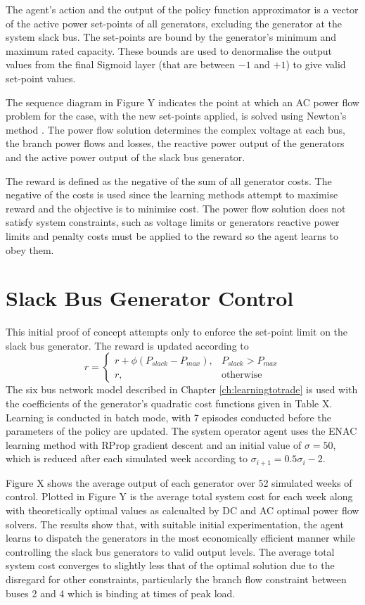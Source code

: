 The agent's action and the output of the policy function approximator is a
vector of the active power set-points of all generators, excluding the
generator at the system slack bus.  The set-points are bound by the generator's minimum
and maximum rated capacity. These bounds are used to denormalise the output
values from the final Sigmoid layer (that are between $-1$ and $+1$) to give
valid set-point values.

The sequence diagram in Figure Y indicates the point at which an AC power flow
problem for the case, with the new set-points applied, is solved using Newton's
method \cite{tinney:67}.  The power flow solution determines the complex
voltage at each bus, the branch power flows and losses, the reactive power
output of the generators and the active power output of the slack bus
generator.

The reward is defined as the negative of the sum of all generator costs.  The
negative of the costs is used since the learning methods attempt to maximise
reward and the objective is to minimise cost.  The power flow solution does not
satisfy system constraints, such as voltage limits or generators reactive power
limits and penalty costs must be applied to the reward so the agent learns to
obey them.

\section{Slack Bus Generator Control}
This initial proof of concept attempts only to enforce the set-point limit on
the slack bus generator.  The reward is updated according to
\begin{equation}
r =
\begin{cases}
r + \phi (P_{slack} - P_{max}), & \text{$P_{slack} > P_{max}$} \\
r, & \text{otherwise}
\end{cases}
\end{equation}
The six bus network model described in Chapter \ref{ch:learningtotrade} is used
with the coefficients of the generator's quadratic cost functions given in Table X.  Learning is conducted in batch
mode, with 7 episodes conducted before the parameters of the policy are
updated.  The system operator agent uses the ENAC learning method with RProp
gradient descent and an initial value of $\sigma = 50$, which is reduced after
each simulated week according to $\sigma_{i+1} = 0.5\sigma_i - 2$.

Figure X shows the average output of each generator over 52 simulated weeks of
control. Plotted in Figure Y is the average total system cost for each week along with
theoretically optimal values as calcualted by DC and AC optimal power flow
solvers.  The results show that, with suitable initial experimentation, the
agent learns to dispatch the generators in the most economically efficient
manner while controlling the slack bus generators to valid output levels.  The
average total system cost converges to slightly less that of the optimal
solution due to the disregard for other constraints, particularly the
branch flow constraint between buses 2 and 4 which is binding at times of peak
load.

